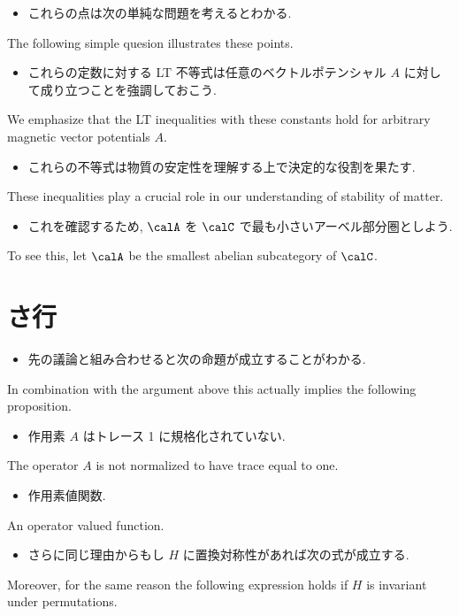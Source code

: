 \documentclass[openany, a4paper, oneside]{jsbook}
\begin{document}
\begin{itemize}
\item これらの点は次の単純な問題を考えるとわかる. \cite{CharlesWeibel1}
\end{itemize}
The following simple quesion illustrates these points.

\begin{itemize}
\item これらの定数に対する LT 不等式は任意のベクトルポテンシャル $A$ に対して成り立つことを強調しておこう. \cite{LiebSeiringer1}
\end{itemize}
We emphasize that the LT inequalities with these constants hold for arbitrary magnetic vector potentials $A$.

\begin{itemize}
\item これらの不等式は物質の安定性を理解する上で決定的な役割を果たす. \cite{LiebSeiringer1}
\end{itemize}
These inequalities play a crucial role in our understanding of stability of matter.

\begin{itemize}
\item これを確認するため, $\calA$ を $\calC$ で最も小さいアーベル部分圏としよう.
\end{itemize}
To see this, let $\calA$ be the smallest abelian subcategory of $\calC$.
\section{さ行}

\begin{itemize}
\item 先の議論と組み合わせると次の命題が成立することがわかる. \cite{LiebSeiringer1}
\end{itemize}
In combination with the argument above this actually implies the following proposition.

\begin{itemize}
\item 作用素 $A$ はトレース 1 に規格化されていない. \cite{LiebSeiringer1}
\end{itemize}
The operator $A$ is not normalized to have trace equal to one.

\begin{itemize}
\item 作用素値関数. \cite{LiebSeiringer1}
\end{itemize}
An operator valued function.

\begin{itemize}
\item さらに同じ理由からもし $H$ に置換対称性があれば次の式が成立する. \cite{LiebSeiringer1}
\end{itemize}
Moreover, for the same reason the following expression holds if $H$ is invariant under permutations.
\end{document}
